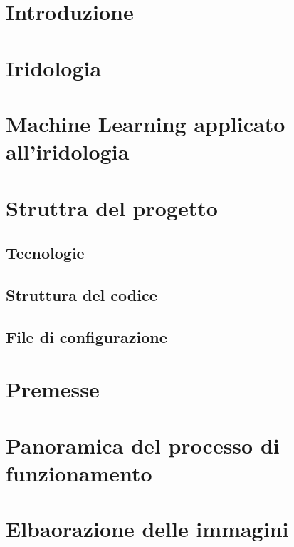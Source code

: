 \documentclass[12pt,twoside,openright]{report}
\begin{document}
  \shipout\null  

  
  
  \tableofcontents
  
  \chapter{Introduzione}
  
  
  \chapter{Iridologia}
  
  
  \chapter{Machine Learning applicato all'iridologia}
  
  
  \chapter{Struttra del progetto}
  \section{Tecnologie}
  
  \section{Struttura del codice}
  
  \section{File di configurazione}
  
  
  \chapter{Premesse}
  
  
  \chapter{Panoramica del processo di funzionamento}
  
  
  \chapter{Elbaorazione delle immagini}
  
\end{document}
